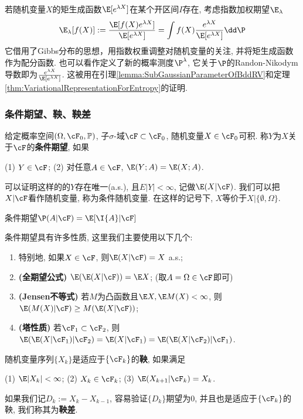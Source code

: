 \begin{example}[指数加权]
	若随机变量$X$的矩生成函数$\E[e^{\lambda X}]$在某个开区间$I$存在, 考虑指数加权期望$\E_{\lambda}$
	\begin{equation*}
		\E_{\lambda} [f(X)]
		:= \frac{\E[f(X) e^{\lambda X}]}{\E[e^{\lambda X}]}
		= \int f(X) \frac{e^{\lambda X}}{\E[e^{\lambda X}]} \dd \P 
	\end{equation*}
	它借用了Gibbs分布的思想，用指数权重调整对随机变量的关注, 并将矩生成函数作为配分函数.  
	也可以看作定义了新的概率测度$\P^{\lambda}$, 它关于$\P$的Randon-Nikodym导数即为$\frac{e^{\lambda X}}{\E[e^{\lambda X}]}$. 
	这被用在引理\ref{lemma:SubGaussianParameterOfBddRV}和定理\ref{thm:VariationalRepresentationForEntropy}的证明.
\end{example}



\subsubsection{条件期望、鞅、鞅差}

给定概率空间$(\Omega, \cF_0, \mathbb{P})$, 子$\sigma$-域$\cF \subset \cF_0$, 随机变量$X \in \cF_0$可积. 
称$Y$为$X$关于$\cF$的\textbf{条件期望}, 如果
\begin{center}
	(1) $Y \in \cF$; \quad
	(2) 对任意$A \in \cF$, $\E(Y;A) = \E(X;A)$. 
\end{center}
可以证明这样的的$Y$存在唯一(a.s.), 且$E|Y| < \infty$, 记做$\E(X|\cF)$. 
我们可以把$X | \cF$看作随机变量, 称为条件随机变量. 
在这样的记号下, $X$等价于$X | \{\emptyset, \Omega\}$. 

条件期望$\P(A | \cF) = \E[\I{A} | \cF]$

条件期望具有许多性质, 这里我们主要使用以下几个: 
	\begin{enumerate}[label=(\roman*)]
		\item 特别地, 如果$X \in \cF$, 则$\E(X|\cF) = X$ a.s.;
		\item \textbf{(全期望公式)} $\E(\E(X|\cF)) = \E X$; (取$A = \Omega \in \cF$即可)
		\item \textbf{(Jensen不等式)} 若$M$为凸函数且$\E X, \E M(X) < \infty$, 则$\E(M(X) | \cF) \geq M(\E(X|\cF))$; 
		\item \textbf{(塔性质)} 若$\cF_1 \subset \cF_2$, 则$\E(\E(X|\cF_1)|\cF_2) = \E(X|\cF_1) = \E(\E(X|\cF_2)|\cF_1)$. 
	\end{enumerate}
随机变量序列$\{X_k\}$是适应于$\{\cF_k\}$的\textbf{鞅}, 如果满足
\begin{center}
	(1) $\E |X_k| < \infty$; \quad
	(2) $X_k \in \cF_k$; \quad
	(3) $\E(X_{k+1}|\cF_k) = X_k$.
\end{center}
如果我们记$D_k := X_k - X_{k-1}$, 容易验证$\{D_k\}$期望为$0$, 并且也是适应于$\{\cF_k\}$的鞅, 我们称其为\textbf{鞅差}. 

